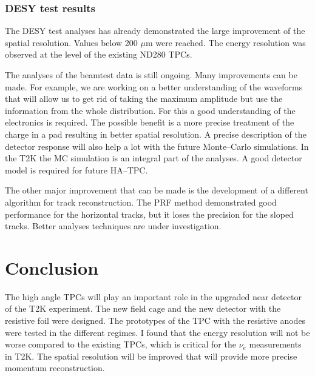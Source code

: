 \documentclass[../main.tex]{subfiles}
\begin{document}
\subsubsection{DESY test results}
The DESY test analyses has already demonstrated the large improvement of the spatial resolution. Values below 200 $\mu\text{m}$ were reached. The energy resolution was observed at the level of the existing ND280 TPCs.

The analyses of the beamtest data is still ongoing. Many improvements can be made. For example, we are working on a better understanding of the waveforms that will allow us to get rid of taking the maximum amplitude but use the information from the whole distribution. For this a good understanding of the electronics is required. The possible benefit is a more precise treatment of the charge in a pad resulting in better spatial resolution. A precise description of the detector response will also help a lot with the future Monte--Carlo simulations. In the T2K the MC simulation is an integral part of the analyses. A good detector model is required for future HA--TPC.

The other major improvement that can be made is the development of a different algorithm for track reconstruction. The PRF method demonstrated good performance for the horizontal tracks, but it loses the precision for the sloped tracks. Better analyses techniques are under investigation.

\section{Conclusion}
The high angle TPCs will play an important role in the upgraded near detector of the T2K experiment. The new field cage and the new detector with the resistive foil were designed. The prototypes of the TPC with the resistive anodes were tested in the different regimes. I found that the energy resolution will not be worse compared to the existing TPCs, which is critical for the $\nu_e$ measurements in T2K. The spatial resolution will be improved that will provide more precise momentum reconstruction.
\end{document}
